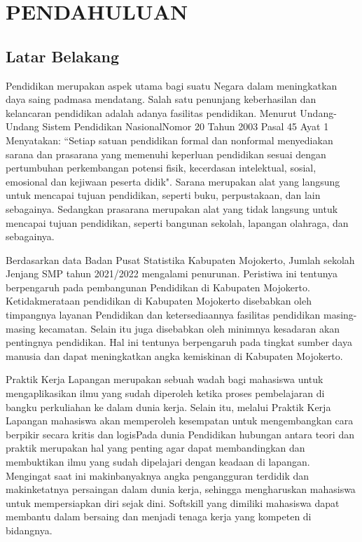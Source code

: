 \chapter{PENDAHULUAN}

\section{Latar Belakang}
Pendidikan merupakan aspek utama bagi suatu Negara dalam meningkatkan daya saing padmasa mendatang. Salah satu penunjang keberhasilan dan kelancaran pendidikan adalah adanya fasilitas pendidikan. Menurut Undang-Undang Sistem Pendidikan NasionalNomor 20 Tahun 2003 Pasal 45 Ayat 1 Menyatakan: “Setiap satuan pendidikan formal dan nonformal menyediakan sarana dan prasarana yang memenuhi keperluan pendidikan sesuai dengan pertumbuhan perkembangan  potensi  fisik,  kecerdasan  intelektual,  sosial, emosional dan kejiwaan peserta didik". Sarana merupakan alat yang langsung untuk mencapai tujuan pendidikan, seperti buku, perpustakaan, dan lain sebagainya. Sedangkan prasarana merupakan alat yang tidak langsung untuk mencapai tujuan pendidikan, seperti bangunan sekolah, lapangan olahraga, dan sebagainya.

Berdasarkan data Badan Pusat Statistika Kabupaten Mojokerto, Jumlah sekolah Jenjang SMP tahun 2021/2022 mengalami penurunan. Peristiwa ini tentunya  berpengaruh  pada  pembangunan  Pendidikan  di  Kabupaten Mojokerto. Ketidakmerataan pendidikan di Kabupaten Mojokerto disebabkan oleh timpangnya layanan Pendidikan dan ketersediaannya fasilitas pendidikan masing-masing kecamatan. Selain itu juga disebabkan oleh minimnya kesadaran akan pentingnya pendidikan. Hal ini tentunya berpengaruh pada tingkat sumber daya manusia dan dapat meningkatkan angka kemiskinan di Kabupaten Mojokerto. 

Praktik Kerja Lapangan merupakan sebuah wadah bagi mahasiswa untuk mengaplikasikan ilmu yang sudah diperoleh ketika proses pembelajaran di bangku perkuliahan ke dalam dunia kerja. Selain itu, melalui Praktik Kerja Lapangan mahasiswa akan memperoleh kesempatan untuk mengembangkan cara berpikir secara kritis dan logisPada dunia Pendidikan hubungan antara teori dan praktik merupakan hal yang penting agar dapat membandingkan dan membuktikan  ilmu  yang  sudah  dipelajari  dengan  keadaan  di  lapangan. Mengingat saat ini makinbanyaknya angka pengangguran terdidik dan makinketatnya persaingan dalam dunia kerja, sehingga mengharuskan mahasiswa untuk mempersiapkan diri sejak dini. Softskill yang dimiliki mahasiswa dapat membantu dalam bersaing dan menjadi tenaga kerja yang kompeten di bidangnya.

